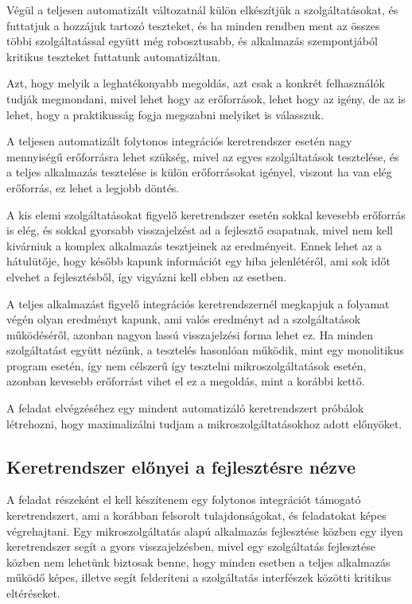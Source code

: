 \documentclass[11pt,magyar,a4paper,twoside,]{report}
\begin{document}
Végül a teljesen automatizált változatnál külön elkészítjük a
szolgáltatásokat, és futtatjuk a hozzájuk tartozó teszteket, és ha
minden rendben ment az összes többi szolgáltatással együtt még
robosztusabb, és alkalmazás szempontjából kritikus teszteket futtatunk
automatizáltan.

Azt, hogy melyik a leghatékonyabb megoldás, azt csak a konkrét
felhasználók tudják megmondani, mivel lehet hogy az erőforrások, lehet
hogy az igény, de az is lehet, hogy a praktikusság fogja megszabni
melyiket is válasszuk.

A teljesen automatizált folytonos integrációs keretrendszer esetén nagy
mennyiségű erőforrásra lehet szükség, mivel az egyes szolgáltatások
tesztelése, és a teljes alkalmazás tesztelése is külön erőforrásokat
igényel, viszont ha van elég erőforrás, ez lehet a legjobb döntés.

A kis elemi szolgáltatásokat figyelő keretrendszer esetén sokkal
kevesebb erőforrás is elég, és sokkal gyorsabb visszajelzést ad a
fejlesztő csapatnak, mivel nem kell kivárniuk a komplex alkalmazás
tesztjeinek az eredményeit. Ennek lehet az a hátulütője, hogy később
kapunk információt egy hiba jelenlétéről, ami sok időt elvehet a
fejlesztésből, így vigyázni kell ebben az esetben.

A teljes alkalmazást figyelő integrációs keretrendszernél megkapjuk a
folyamat végén olyan eredményt kapunk, ami valós eredményt ad a
szolgáltatások működéséről, azonban nagyon lassú visszajelzési forma
lehet ez. Ha minden szolgáltatást együtt nézünk, a tesztelés hasonlóan
működik, mint egy monolitikus program esetén, így nem célszerű így
tesztelni mikroszolgáltatások esetén, azonban kevesebb erőforrást vihet
el ez a megoldás, mint a korábbi kettő.

A feladat elvégzéséhez egy mindent automatizáló keretrendszert próbálok
létrehozni, hogy maximalizálni tudjam a mikroszolgáltatásokhoz adott
előnyöket.

\subsection{Keretrendszer előnyei a fejlesztésre
nézve}\label{keretrendszer-elux151nyei-a-fejlesztuxe9sre-nuxe9zve}

A feladat részeként el kell készítenem egy folytonos integrációt
támogató keretrendszert, ami a korábban felsorolt tulajdonságokat, és
feladatokat képes végrehajtani. Egy mikroszolgáltatás alapú alkalmazás
fejlesztése közben egy ilyen keretrendszer segít a gyors
visszajelzésben, mivel egy szolgáltatás fejlesztése közben nem lehetünk
biztosak benne, hogy minden esetben a teljes alkalmazás működő képes,
illetve segít felderíteni a szolgáltatás interfészek közötti kritikus
eltéréseket.
\end{document}
